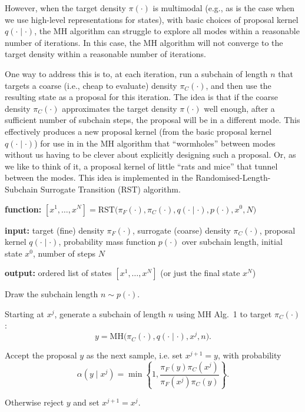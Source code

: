 \documentclass[12pt]{article}
\theoremstyle{definition}
\theoremstyle{remark}
\theoremstyle{plain}
\begin{document}
However, when the target density $\pi(\cdot)$ is multimodal 
(e.g., as is the case when we use high-level representations for states), 
with basic choices of proposal kernel $q(\cdot\mid\cdot)$,
the MH algorithm can struggle to explore all modes within a reasonable number of iterations.
In this case, the MH algorithm will not converge to the target density within a reasonable number of iterations. 

One way to address this is to, at each iteration, run a subchain of length $n$ that targets 
a coarse (i.e., cheap to evaluate) density $\pi_{C}(\cdot)$, and then use the resulting state as a proposal for this iteration.
The idea is that 
if the coarse density $\pi_{C}(\cdot)$ approximates the target density $\pi(\cdot)$ well enough,
after a sufficient number of subchain steps, the proposal will be in a different mode. 
This effectively produces a new proposal kernel (from the basic proposal kernel $q(\cdot\mid\cdot)$) for use in 
in the MH algorithm that ``wormholes'' between modes without us having to be clever about explicitly designing such a proposal. 
Or, as we like to think of it, a proposal kernel of little ``rats and mice'' that tunnel between the modes.
This idea is implemented in the Randomised-Length-Subchain Surrogate Transition (RST) algorithm. 

\begin{algorithm}[H]
  \caption{Randomised-Length-Subchain Surrogate Transition (RST)}
  \label{alg:rst}
  \textbf{function:} $[x^1,\ldots,x^N] =
  \mathrm{RST}\bigl(
      \pi_F(\cdot),
      \pi_C(\cdot),
      q(\cdot\mid\cdot),
      p(\cdot),
      x^0,
      N
  \bigr)$
  
  \textbf{input:} target (fine) density $\pi_F(\cdot)$, surrogate (coarse) density $\pi_C(\cdot)$,
  proposal kernel $q(\cdot\mid\cdot)$, probability mass function $p(\cdot)$ over subchain length,
  initial state $x^0$, number of steps $N$
  
  \textbf{output:} ordered list of states $[x^1,\ldots,x^N]$
  (or just the final state $x^N$)
  
  \begin{algorithmic}[1]
      \State Draw the subchain length $n \sim p(\cdot)$.

      \State Starting at $x^j$, generate a subchain of length $n$ using MH Alg.~1 to target $\pi_C(\cdot)$:
      \[
          y
          =
          \mathrm{MH}\bigl(
              \pi_C(\cdot),
              q(\cdot\mid\cdot),
              x^j,
              n
          \bigr).
      \]
      
      \State Accept the proposal $y$ as the next sample, i.e. set
      $x^{j+1} = y$, with probability
      \[
          \alpha(y \mid x^j)
          =
          \min\left\{
              1,
              \frac{
                  \pi_F(y)\pi_C(x^j)
              }{
                  \pi_F(x^j)\pi_C(y)
              }
          \right\}.
      \]
      
      \State Otherwise reject $y$ and set $x^{j+1} = x^j$.
  \EndFor
  \end{algorithmic}
\end{algorithm}
\end{document}
